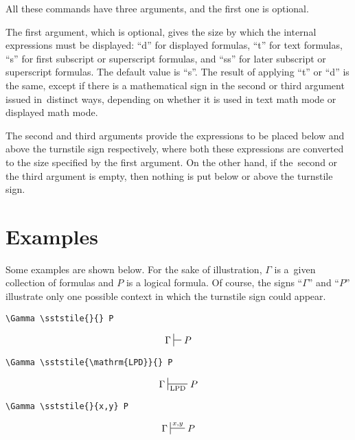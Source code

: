 \documentclass{pracjourn}
\begin{document}
All these commands have three arguments, and the first one is optional.

The first argument, which is optional, gives the size by which the internal expressions must be displayed: ``d'' for displayed formulas, ``t'' for text formulas, ``s'' for first subscript or superscript formulas, and ``ss'' for later subscript or superscript formulas. The default value is ``s''. The result of applying ``t'' or ``d'' is the same, except if there is a mathematical sign in the second or third argument issued in~distinct ways, depending on whether it is used in text math mode or displayed math mode.

The second and third arguments provide the expressions to be placed below and above the turnstile sign respectively, where both these expressions are converted to the size specified by the first argument. On the other hand, if the~second or the third argument is empty, then nothing is put below or above the turnstile sign.

\section{Examples} %
\label{sec:examples}

Some examples are shown below.  For the sake of illustration, $\Gamma$ is a~given collection of formulas and $P$ is a logical formula. Of course, the signs ``$\Gamma$'' and ``$P$'' illustrate only one possible context in which the turnstile sign could appear.

\begin{verbatim}
\Gamma \sststile{}{} P
\end{verbatim}
\begin{equation}\Gamma \sststile{}{} P \end{equation} \vspace{0.4em}

\pagebreak

\begin{verbatim}
\Gamma \sststile{\mathrm{LPD}}{} P
\end{verbatim}
\begin{equation}\Gamma \sststile{\mathrm{LPD}}{} P\end{equation} \vspace{0.4em}

\begin{verbatim}
\Gamma \sststile{}{x,y} P
\end{verbatim}
\begin{equation}\Gamma \sststile{}{x,y} P\end{equation} \vspace{0.4em}
\end{document}
